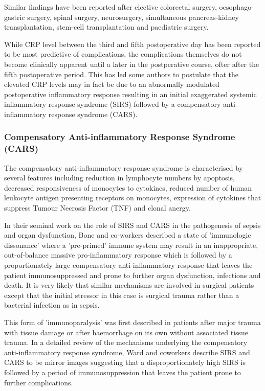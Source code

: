 Similar findings have been reported after elective colorectal surgery\parencite{ortega-deballon_c-reactive_2010, woeste_increased_2010}, oesophago-gastric surgery\parencite{dutta_persistent_2011}, spinal surgery\parencite{meyer_c-reactive_1995,mok_use_2008}, neurosurgery\parencite{al-jabi_value_2010}, simultaneous pancreas-kidney transplantation\parencite{wullstein_high_2004}, stem-cell transplantation\parencite{mcneer_early_2010} and paediatric surgery\parencite{laporta_baez_c-reactive_2011}.

While CRP level between the third and fifth postoperative day has been reported to be most predictive of complications,  the complications themselves do not become clinically apparent until a later in the postperative course, ofter after the fifth postoperative period. This has led some authors to postulate that the elevated CRP levels may in fact be due to an abnormally modulated postoperative inflammatory response resulting in an initial exaggerated systemic inflammatory response syndrome (SIRS) followed by a compensatory anti-inflammatory response syndrome (CARS). 

\subsubsection{Compensatory Anti-inflammatory Response Syndrome (CARS)}
The compensatory anti-inflammatory response syndrome is characterised by several features including reduction in lymphocyte numbers by apoptosis, decreased responsiveness of monocytes to cytokines, reduced number of human leukocyte antigen presenting receptors on monocytes, expression of cytokines that suppress Tumour Necrosis Factor (TNF) and clonal anergy.

In their seminal work on the role of SIRS and CARS in the pathogenesis of sepsis and organ dysfunction, Bone and co-workers described a state of 'immunologic dissonance' where a 'pre-primed' immune system may result in an inappropriate, out-of-balance massive pro-inflammatory response which is followed by a proportionately large compensatory anti-inflammatory response that leaves the patient immunosuppressed and prone to further organ dysfunction, infections and death. \parencite{bone_sepsis:_1997, bone_immunologic_1996} It is very likely that similar mechanisms are involved in surgical patients except that the initial stressor in this case is surgical trauma rather than a bacterial infection as in sepsis. 

This form of 'immunoparalysis' was first described in patients after major trauma with tissue damage \parencite{abraham_effects_1985,bandyopadhyay_negative_2007} or after haemorrhage on its own without associated tissue trauma. \parencite{stephan_hemorrhage_1987} In a detailed review of the mechanisms underlying the compensatory anti-inflammatory response syndrome, Ward and coworkers describe SIRS and CARS to be mirror images suggesting that a disproportionately high SIRS is followed by a period of immunosuppression that leaves the patient prone to further complications.\parencite{ward_compensatory_2008}

